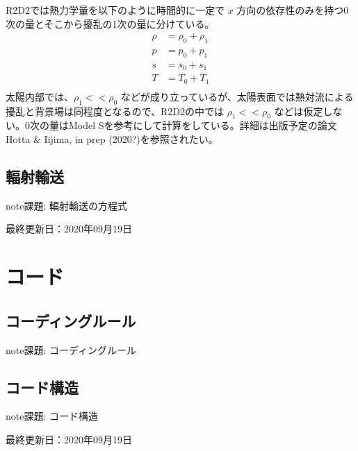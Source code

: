 \documentclass[letterpaper,10pt,dvipdfmx,report]{sphinxmanual}
\begin{document}
R2D2では熱力学量を以下のように時間的に一定で \(x\) 方向の依存性のみを持つ0次の量とそこから擾乱の1次の量に分けている。
\begin{equation*}
\begin{split}\rho &= \rho_0 + \rho_1 \\
p &= p_0 + p_1 \\
s &= s_0 + s_1 \\
T &= T_0 + T_1 \\\end{split}
\end{equation*}
太陽内部では、\(\rho_1 << \rho_0\) などが成り立っているが、太陽表面では熱対流による擾乱と背景場は同程度となるので、R2D2の中では \(\rho_1 << \rho_0\) などは仮定しない。0次の量はModel Sを参考にして計算をしている。詳細は出版予定の論文Hotta \& Iijima, in prep (2020?)を参照されたい。


\section{輻射輸送}
\label{\detokenize{equation:id3}}
\begin{sphinxadmonition}{note}{\label{\detokenize{equation:id4}}課題:}
輻射輸送の方程式
\end{sphinxadmonition}

最終更新日：2020年09月19日


\chapter{コード}
\label{\detokenize{code:id1}}\label{\detokenize{code::doc}}

\section{コーディングルール}
\label{\detokenize{code:id2}}
\begin{sphinxadmonition}{note}{\label{\detokenize{code:id3}}課題:}
コーディングルール
\end{sphinxadmonition}


\section{コード構造}
\label{\detokenize{code:id4}}
\begin{sphinxadmonition}{note}{\label{\detokenize{code:id5}}課題:}
コード構造
\end{sphinxadmonition}

最終更新日：2020年09月19日
\end{document}
